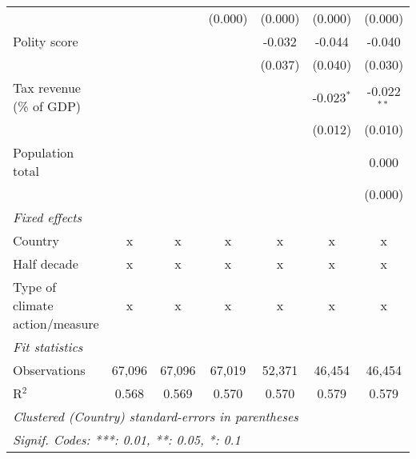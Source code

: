 \begin{tabular}{lcccccc}
                                                                               &         &                & (0.000)        & (0.000)        & (0.000)        & (0.000)\\   
   Polity score                                                                &         &                &                & -0.032         & -0.044         & -0.040\\   
                                                                               &         &                &                & (0.037)        & (0.040)        & (0.030)\\   
   Tax revenue (\% of GDP)                                                     &         &                &                &                & -0.023$^{*}$   & -0.022$^{**}$\\   
                                                                               &         &                &                &                & (0.012)        & (0.010)\\   
   Population total                                                            &         &                &                &                &                & 0.000\\   
                                                                               &         &                &                &                &                & (0.000)\\   
   \emph{Fixed effects}\\
   Country                                                                     & x       & x              & x              & x              & x              & x\\  
   Half decade                                                                 & x       & x              & x              & x              & x              & x\\  
   Type of climate action/measure                                              & x       & x              & x              & x              & x              & x\\  
   \midrule \emph{Fit statistics}\\
   Observations                                                                & 67,096  & 67,096         & 67,019         & 52,371         & 46,454         & 46,454\\  
   R$^2$                                                                       & 0.568   & 0.569          & 0.570          & 0.570          & 0.579          & 0.579\\  
   \midrule
   \multicolumn{7}{l}{\emph{Clustered (Country) standard-errors in parentheses}}\\
   \multicolumn{7}{l}{\emph{Signif. Codes: ***: 0.01, **: 0.05, *: 0.1}}\\
\end{tabular}
\par\endgroup


